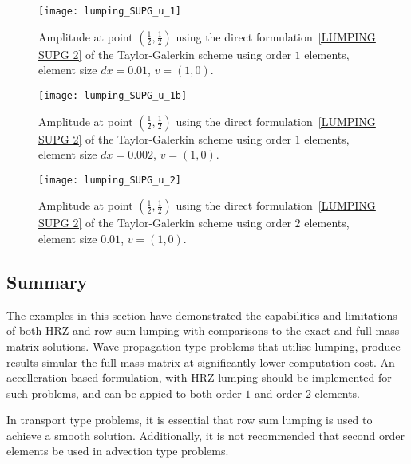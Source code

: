 \begin{figure}[ht]
\centerline{\texttt{[image: lumping\_SUPG\_u\_1]}}
\caption{Amplitude at point $(\frac{1}{2},\frac{1}{2})$ using the direct formulation~\ref{LUMPING SUPG 2} of the 
Taylor-Galerkin scheme using order $1$ elements, element size $dx=0.01$, $v=(1,0)$.}
\label{FIG LUMPING SUPG A}
\end{figure}

\begin{figure}[ht]
\centerline{\texttt{[image: lumping\_SUPG\_u\_1b]}}
\caption{Amplitude at point $(\frac{1}{2},\frac{1}{2})$ using the direct formulation~\ref{LUMPING SUPG 2} of the 
Taylor-Galerkin scheme using order $1$ elements, element size $dx=0.002$, $v=(1,0)$.}
\label{FIG LUMPING SUPG Ab}
\end{figure}

\begin{figure}[ht]
\centerline{\texttt{[image: lumping\_SUPG\_u\_2]}}
\caption{Amplitude at point $(\frac{1}{2},\frac{1}{2})$ using the direct formulation~\ref{LUMPING SUPG 2} of the 
Taylor-Galerkin scheme  using order $2$ elements, element size $0.01$, $v=(1,0)$.}
\label{FIG LUMPING SUPG B}
\end{figure}

\subsection{Summary}
The examples in this section have demonstrated the capabilities and limitations
of both HRZ and row sum lumping with comparisons to the exact and full mass 
matrix solutions. Wave propagation type problems that utilise lumping, produce 
results simular the full mass matrix at significantly 
lower computation cost. An accelleration based formulation, with HRZ lumping 
should be implemented for such problems, and can be appied to both order $1$ and
 order $2$ elements. 

In transport type problems, it is essential that row sum lumping is used to 
achieve a smooth solution. Additionally, it is not recommended that second order
elements be used in advection type problems.



